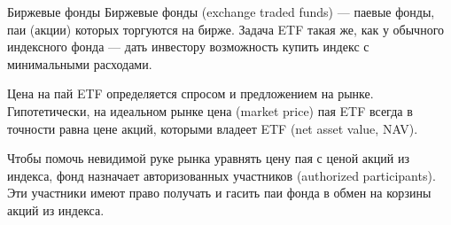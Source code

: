 \documentclass{beamer}
\begin{document}
\begin{frame}{Биржевые фонды}
\justify
Биржевые фонды (exchange traded funds) --- паевые фонды, паи (акции) которых 
торгуются на бирже. Задача ETF такая же, как у обычного индексного фонда --- 
дать инвестору возможность купить индекс с минимальными расходами.

\justify
Цена на пай ETF определяется спросом и предложением на рынке. Гипотетически, на 
идеальном рынке цена (market price) пая ETF всегда в точности равна цене акций, 
которыми владеет ETF (net asset value, NAV).

\justify
Чтобы помочь невидимой руке рынка уравнять цену пая с ценой акций из индекса, 
фонд назначает авторизованных участников (authorized participants). Эти 
участники имеют право получать и гасить паи фонда в обмен на корзины акций из 
индекса.
\end{frame}
\end{document}
